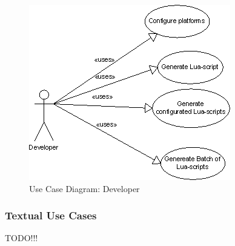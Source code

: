 \begin{figure}[here]
\includegraphics[scale=1]{./planning/img/developer.png}
\caption{Use Case Diagram: Developer}
\label{fig:uc_dev}
\end{figure}

\subsubsection{Textual Use Cases}
TODO!!!





